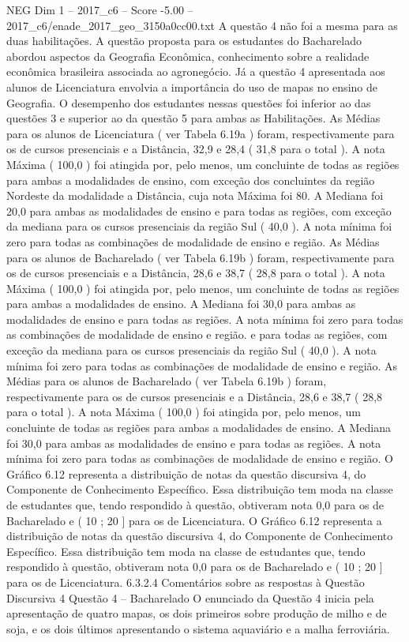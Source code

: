 \begin{textsample}{NEG Dim 1 – 2017\_c6 – Score -5.00 – 2017\_c6/enade\_2017\_geo\_3150a0cc00.txt}
A questão 4 não foi a mesma para as duas habilitações.
A questão proposta para os estudantes do Bacharelado abordou aspectos da Geografia Econômica, conhecimento sobre a realidade econômica brasileira associada ao agronegócio.
Já a questão 4 apresentada aos alunos de Licenciatura envolvia a importância do uso de mapas no ensino de Geografia.
O desempenho dos estudantes nessas questões foi inferior ao das questões 3 e superior ao da questão 5 para ambas as Habilitações.
As Médias para os alunos de Licenciatura ( ver Tabela 6.19a ) foram, respectivamente para os de cursos presenciais e a Distância, 32,9 e 28,4 ( 31,8 para o total ).
A nota Máxima ( 100,0 ) foi atingida por, pelo menos, um concluinte de todas as regiões para ambas a modalidades de ensino, com exceção dos concluintes da região Nordeste da modalidade a Distância, cuja nota Máxima foi 80.
A Mediana foi 20,0 para ambas as modalidades de ensino e para todas as regiões, com exceção da mediana para os cursos presenciais da região Sul ( 40,0 ).
A nota mínima foi zero para todas as combinações de modalidade de ensino e região.
As Médias para os alunos de Bacharelado ( ver Tabela 6.19b ) foram, respectivamente para os de cursos presenciais e a Distância, 28,6 e 38,7 ( 28,8 para o total ).
A nota Máxima ( 100,0 ) foi atingida por, pelo menos, um concluinte de todas as regiões para ambas a modalidades de ensino.
A Mediana foi 30,0 para ambas as modalidades de ensino e para todas as regiões.
A nota mínima foi zero para todas as combinações de modalidade de ensino e região. e para todas as regiões, com exceção da mediana para os cursos presenciais da região Sul ( 40,0 ).
A nota mínima foi zero para todas as combinações de modalidade de ensino e região.
As Médias para os alunos de Bacharelado ( ver Tabela 6.19b ) foram, respectivamente para os de cursos presenciais e a Distância, 28,6 e 38,7 ( 28,8 para o total ).
A nota Máxima ( 100,0 ) foi atingida por, pelo menos, um concluinte de todas as regiões para ambas a modalidades de ensino.
A Mediana foi 30,0 para ambas as modalidades de ensino e para todas as regiões.
A nota mínima foi zero para todas as combinações de modalidade de ensino e região.
O Gráfico 6.12 representa a distribuição de notas da questão discursiva 4, do Componente de Conhecimento Específico.
Essa distribuição tem moda na classe de estudantes que, tendo respondido à questão, obtiveram nota 0,0 para os de Bacharelado e ( 10 ; 20 ] para os de Licenciatura.
O Gráfico 6.12 representa a distribuição de notas da questão discursiva 4, do Componente de Conhecimento Específico.
Essa distribuição tem moda na classe de estudantes que, tendo respondido à questão, obtiveram nota 0,0 para os de Bacharelado e ( 10 ; 20 ] para os de Licenciatura. 6.3.2.4 Comentários sobre as respostas à Questão Discursiva 4 Questão 4 – Bacharelado O enunciado da Questão 4 inicia pela apresentação de quatro mapas, os dois primeiros sobre produção de milho e de soja, e os dois últimos apresentando o sistema aquaviário e a malha ferroviária.

\end{textsample}
